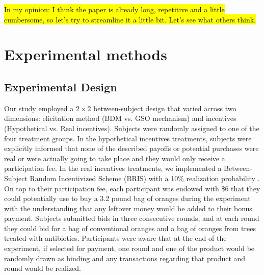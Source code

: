 \documentclass[12pt]{article}
\begin{document}
\hl{In my opinion: I think the paper is already long, repetitive and a little cumbersome, so let's try to streamline it a little bit. Let's see what others think.}

\section{Experimental methods}
\label{Experiment}

\subsection{Experimental Design}
Our study employed a $2\times2$ between-subject design that varied across two dimensions: elicitation method (BDM vs. GSO mechanism) and incentives (Hypothetical vs. Real incentives). Subjects were randomly assigned to one of the four treatment groups. In the hypothetical incentives treatments, subjects were explicitly informed that none of the described payoffs or potential purchases were real or were actually going to take place and they would only receive a participation fee. In the real incentives treatments, we implemented a Between-Subject Random Incentivized Scheme (BRIS) with a 10\% realization probability \citep{ahles_testing_2024}. On top to their participation fee, each participant was endowed with \$6 that they could potentially use to buy a 3.2 pound bag of oranges during the experiment with the understanding that any leftover money would be added to their bonus payment. Subjects submitted bids in three consecutive rounds, and at each round they could bid for a bag of conventional oranges and a bag of oranges from trees treated with antibiotics. Participants were aware that at the end of the experiment, if selected for payment, one round and one of the product would be randomly drawn as binding and any transactions regarding that product and round would be realized.%
\end{document}
